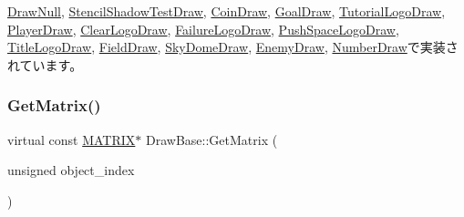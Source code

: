 \mbox{\hyperlink{class_draw_null_a84969d22d3436986f214e9896fe44fc6}{Draw\+Null}}, \mbox{\hyperlink{class_stencil_shadow_test_draw_abfc9caaaa1b6120e2013701a9d264f2d}{Stencil\+Shadow\+Test\+Draw}}, \mbox{\hyperlink{class_coin_draw_a869a6b7273b273048dd56822fae4d644}{Coin\+Draw}}, \mbox{\hyperlink{class_goal_draw_a47baf72f8c1c961176610f161069b8d1}{Goal\+Draw}}, \mbox{\hyperlink{class_tutorial_logo_draw_a3a97860361e32a727246e99052715f37}{Tutorial\+Logo\+Draw}}, \mbox{\hyperlink{class_player_draw_ae818d3adaf5120845c2a78c230b5365e}{Player\+Draw}}, \mbox{\hyperlink{class_clear_logo_draw_ab356bf5d56c10a6689e101b35c30d889}{Clear\+Logo\+Draw}}, \mbox{\hyperlink{class_failure_logo_draw_aaac019fb396a354ef0f823ed2bd72322}{Failure\+Logo\+Draw}}, \mbox{\hyperlink{class_push_space_logo_draw_a0734eed4096afb12e6c9ef1f4d82b9d8}{Push\+Space\+Logo\+Draw}}, \mbox{\hyperlink{class_title_logo_draw_a8858aa1b1eb9a6d4cb4605519efb20eb}{Title\+Logo\+Draw}}, \mbox{\hyperlink{class_field_draw_ab126f938895211ff170bc37045a8e7a2}{Field\+Draw}}, \mbox{\hyperlink{class_sky_dome_draw_acbc487d912b464474ae6f1afd7d6bb74}{Sky\+Dome\+Draw}}, \mbox{\hyperlink{class_enemy_draw_a12f00116f7fa97e07317a949d5c27bb4}{Enemy\+Draw}}, \mbox{\hyperlink{class_number_draw_a3348d9d1cdd9dd03be25b82069275ca5}{Number\+Draw}}で実装されています。

\mbox{\label{class_draw_base_a01239bf362040f7f2ef5e5f5371dcf18}} 
\subsubsection{\texorpdfstring{Get\+Matrix()}{GetMatrix()}}
{\footnotesize\ttfamily virtual const \mbox{\hyperlink{_vector3_d_8h_a032295cd9fb1b711757c90667278e744}{M\+A\+T\+R\+IX}}$\ast$ Draw\+Base\+::\+Get\+Matrix (\begin{DoxyParamCaption}\item[{unsigned}]{object\+\_\+index }\end{DoxyParamCaption})\hspace{0.3cm}{\ttfamily [pure virtual]}}



